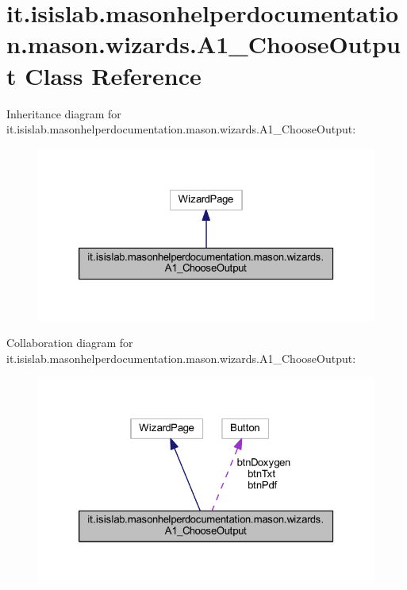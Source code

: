 \hypertarget{classit_1_1isislab_1_1masonhelperdocumentation_1_1mason_1_1wizards_1_1_a1___choose_output}{\section{it.\-isislab.\-masonhelperdocumentation.\-mason.\-wizards.\-A1\-\_\-\-Choose\-Output Class Reference}
\label{classit_1_1isislab_1_1masonhelperdocumentation_1_1mason_1_1wizards_1_1_a1___choose_output}
}


Inheritance diagram for it.\-isislab.\-masonhelperdocumentation.\-mason.\-wizards.\-A1\-\_\-\-Choose\-Output\-:\nopagebreak
\begin{figure}[H]
\begin{center}
\leavevmode
\includegraphics[width=326pt]{classit_1_1isislab_1_1masonhelperdocumentation_1_1mason_1_1wizards_1_1_a1___choose_output__inherit__graph}
\end{center}
\end{figure}


Collaboration diagram for it.\-isislab.\-masonhelperdocumentation.\-mason.\-wizards.\-A1\-\_\-\-Choose\-Output\-:\nopagebreak
\begin{figure}[H]
\begin{center}
\leavevmode
\includegraphics[width=326pt]{classit_1_1isislab_1_1masonhelperdocumentation_1_1mason_1_1wizards_1_1_a1___choose_output__coll__graph}
\end{center}
\end{figure}
